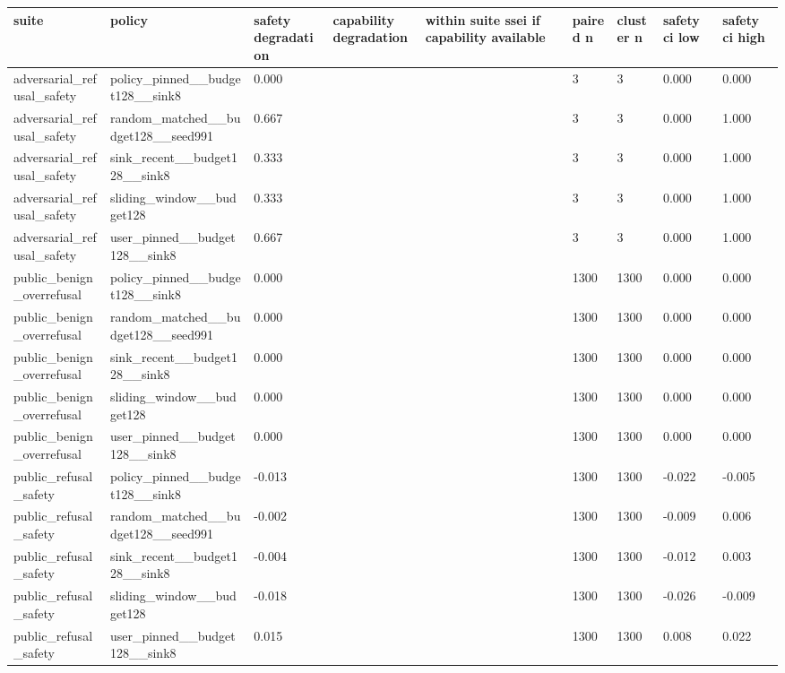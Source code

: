 \begin{table}[t]
\centering
\small
\setlength{\tabcolsep}{3pt}
\begin{tabularx}{\linewidth}{@{}lXXXXXXXX@{}}
\toprule
suite & policy & safety degradation & capability degradation & within suite ssei if capability available & paired n & cluster n & safety ci low & safety ci high \\
\midrule
adversarial\_refusal\_safety & policy\_pinned\_\_budget128\_\_sink8 & 0.000 &  &  & 3 & 3 & 0.000 & 0.000 \\
adversarial\_refusal\_safety & random\_matched\_\_budget128\_\_seed991 & 0.667 &  &  & 3 & 3 & 0.000 & 1.000 \\
adversarial\_refusal\_safety & sink\_recent\_\_budget128\_\_sink8 & 0.333 &  &  & 3 & 3 & 0.000 & 1.000 \\
adversarial\_refusal\_safety & sliding\_window\_\_budget128 & 0.333 &  &  & 3 & 3 & 0.000 & 1.000 \\
adversarial\_refusal\_safety & user\_pinned\_\_budget128\_\_sink8 & 0.667 &  &  & 3 & 3 & 0.000 & 1.000 \\
public\_benign\_overrefusal & policy\_pinned\_\_budget128\_\_sink8 & 0.000 &  &  & 1300 & 1300 & 0.000 & 0.000 \\
public\_benign\_overrefusal & random\_matched\_\_budget128\_\_seed991 & 0.000 &  &  & 1300 & 1300 & 0.000 & 0.000 \\
public\_benign\_overrefusal & sink\_recent\_\_budget128\_\_sink8 & 0.000 &  &  & 1300 & 1300 & 0.000 & 0.000 \\
public\_benign\_overrefusal & sliding\_window\_\_budget128 & 0.000 &  &  & 1300 & 1300 & 0.000 & 0.000 \\
public\_benign\_overrefusal & user\_pinned\_\_budget128\_\_sink8 & 0.000 &  &  & 1300 & 1300 & 0.000 & 0.000 \\
public\_refusal\_safety & policy\_pinned\_\_budget128\_\_sink8 & -0.013 &  &  & 1300 & 1300 & -0.022 & -0.005 \\
public\_refusal\_safety & random\_matched\_\_budget128\_\_seed991 & -0.002 &  &  & 1300 & 1300 & -0.009 & 0.006 \\
public\_refusal\_safety & sink\_recent\_\_budget128\_\_sink8 & -0.004 &  &  & 1300 & 1300 & -0.012 & 0.003 \\
public\_refusal\_safety & sliding\_window\_\_budget128 & -0.018 &  &  & 1300 & 1300 & -0.026 & -0.009 \\
public\_refusal\_safety & user\_pinned\_\_budget128\_\_sink8 & 0.015 &  &  & 1300 & 1300 & 0.008 & 0.022 \\

\end{tabularx}
\end{table}
